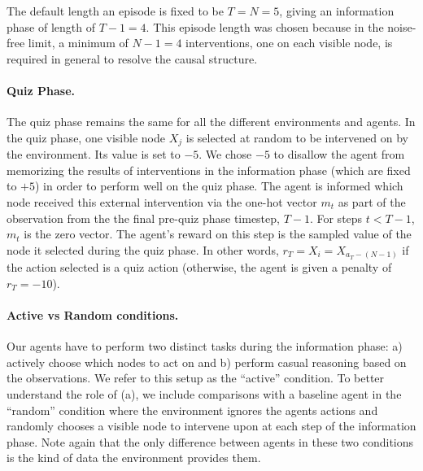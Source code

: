 The default length an episode is fixed to be $T=N=5$, giving an information phase of length of $T-1=4$. This episode length was chosen because in the noise-free limit, a minimum of $N-1 = 4$ interventions, one on each visible node, is required in general to resolve the causal structure. 


\paragraph{Quiz Phase.}
The quiz phase remains the same for all the different environments and agents. In the quiz phase, one visible node $X_j$ is selected at random to be intervened on by the environment. Its value is set to $-5$. We chose $-5$ to disallow the agent from memorizing the results of interventions in the information phase (which are fixed to $+5$) in order to perform well on the quiz phase. The agent is informed which node received this external intervention via the one-hot vector $m_t$ as part of the observation from the the final pre-quiz phase timestep, $T-1$. For steps $t < T-1$, $m_t$ is the zero vector. The agent's reward on this step is the sampled value of the node it selected during the quiz phase. In other words, $r_T = X_i = X_{a_T-(N-1)}$ if the action selected is a quiz action (otherwise, the agent is given a penalty of $r_T = -10$).


\paragraph{Active vs Random conditions.}
Our agents have to perform two distinct tasks during the information phase: a) actively choose which nodes to act on and b) perform casual reasoning based on the observations. We refer to this setup as the ``active'' condition.
To better understand the role of (a), we include comparisons with a baseline agent in the ``random'' condition where the environment ignores the agents actions and randomly chooses a visible node to intervene upon at each step of the information phase. Note again that the only difference between agents in these two conditions is the kind of data the environment provides them.


